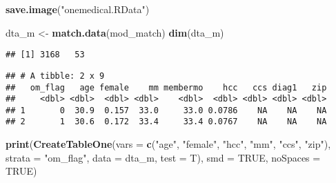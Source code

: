 \documentclass[]{article}
\newenvironment{Shaded}{\begin{snugshade}}{\end{snugshade}}
\newcommand{\KeywordTok}[1]{\textcolor[rgb]{0.13,0.29,0.53}{\textbf{#1}}}
\newcommand{\DataTypeTok}[1]{\textcolor[rgb]{0.13,0.29,0.53}{#1}}
\newcommand{\StringTok}[1]{\textcolor[rgb]{0.31,0.60,0.02}{#1}}
\newcommand{\OtherTok}[1]{\textcolor[rgb]{0.56,0.35,0.01}{#1}}
\newcommand{\OperatorTok}[1]{\textcolor[rgb]{0.81,0.36,0.00}{\textbf{#1}}}
\newcommand{\NormalTok}[1]{#1}
\begin{document}
\begin{Shaded}
\begin{Highlighting}[]
\KeywordTok{save.image}\NormalTok{(}\StringTok{"onemedical.RData"}\NormalTok{)}

\NormalTok{dta_m <-}\StringTok{ }\KeywordTok{match.data}\NormalTok{(mod_match)}
\KeywordTok{dim}\NormalTok{(dta_m)}
\end{Highlighting}
\end{Shaded}

\begin{verbatim}
## [1] 3168   53
\end{verbatim}

\begin{Shaded}
\end{Shaded}

\begin{verbatim}
## # A tibble: 2 x 9
##   om_flag   age female    mm membermo    hcc   ccs diag1   zip
##     <dbl> <dbl>  <dbl> <dbl>    <dbl>  <dbl> <dbl> <dbl> <dbl>
## 1       0  30.9  0.157  33.0     33.0 0.0786    NA    NA    NA
## 2       1  30.6  0.172  33.4     33.4 0.0767    NA    NA    NA
\end{verbatim}

\begin{Shaded}
\begin{Highlighting}[]
\KeywordTok{print}\NormalTok{(}\KeywordTok{CreateTableOne}\NormalTok{(}\DataTypeTok{vars =} \KeywordTok{c}\NormalTok{(}\StringTok{"age"}\NormalTok{, }\StringTok{"female"}\NormalTok{, }\StringTok{"hcc"}\NormalTok{, }\StringTok{"mm"}\NormalTok{,  }\StringTok{"ccs"}\NormalTok{, }\StringTok{"zip"}\NormalTok{), }\DataTypeTok{strata =} \StringTok{"om_flag"}\NormalTok{, }\DataTypeTok{data =}\NormalTok{ dta_m, }\DataTypeTok{test =}\NormalTok{ T), }\DataTypeTok{smd =} \OtherTok{TRUE}\NormalTok{, }\DataTypeTok{noSpaces =} \OtherTok{TRUE}\NormalTok{)}
\end{Highlighting}
\end{Shaded}
\end{document}
